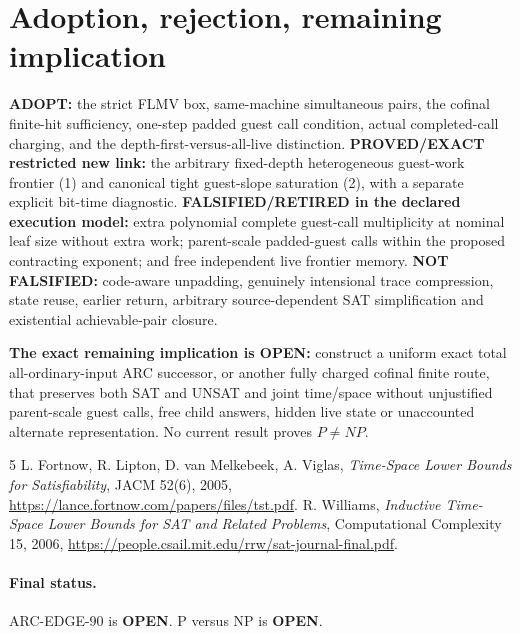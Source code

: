 \documentclass[11pt]{article}
\newcommand{\OPEN}{\textbf{OPEN}}
\begin{document}
\section{Adoption, rejection, remaining implication}
\textbf{ADOPT:} the strict FLMV box, same-machine simultaneous pairs, the
cofinal finite-hit sufficiency, one-step padded guest call condition, actual
completed-call charging, and the depth-first-versus-all-live distinction.
\textbf{PROVED/EXACT restricted new link:} the arbitrary fixed-depth
heterogeneous guest-work frontier (1) and canonical tight guest-slope
saturation (2), with a separate explicit bit-time diagnostic.
\textbf{FALSIFIED/RETIRED in the declared execution model:} extra polynomial
complete guest-call multiplicity at nominal leaf size without extra work;
parent-scale padded-guest calls within the proposed contracting exponent;
and free independent live frontier memory. \textbf{NOT FALSIFIED:} code-aware
unpadding, genuinely intensional trace compression, state reuse, earlier
return, arbitrary source-dependent SAT simplification and existential
achievable-pair closure.

\textbf{The exact remaining implication is OPEN:} construct a uniform exact
total all-ordinary-input ARC successor, or another fully charged cofinal finite
route, that preserves both SAT and UNSAT and joint time/space without
unjustified parent-scale guest calls, free child answers, hidden live state or
unaccounted alternate representation. No current result proves $P\ne NP$.

\begin{thebibliography}{5}
 L. Fortnow, R. Lipton, D. van Melkebeek, A. Viglas,
\emph{Time-Space Lower Bounds for Satisfiability}, JACM 52(6), 2005,
\url{https://lance.fortnow.com/papers/files/tst.pdf}.
 R. Williams,
\emph{Inductive Time-Space Lower Bounds for SAT and Related Problems},
Computational Complexity 15, 2006,
\url{https://people.csail.mit.edu/rrw/sat-journal-final.pdf}.
\end{thebibliography}

\paragraph{Final status.}
ARC-EDGE-90 is \OPEN{}. P versus NP is \OPEN{}.
\end{document}
